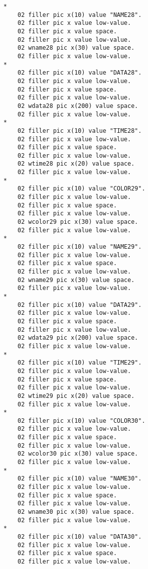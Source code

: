 {{{\begin{verbatim}
      *    
          02 filler pic x(10) value "NAME28".
          02 filler pic x value low-value.
          02 filler pic x value space.
          02 filler pic x value low-value.
          02 wname28 pic x(30) value space.
          02 filler pic x value low-value.
      *    
          02 filler pic x(10) value "DATA28".
          02 filler pic x value low-value.
          02 filler pic x value space.
          02 filler pic x value low-value.
          02 wdata28 pic x(200) value space.
          02 filler pic x value low-value.
      *    
          02 filler pic x(10) value "TIME28".
          02 filler pic x value low-value.
          02 filler pic x value space.
          02 filler pic x value low-value.
          02 wtime28 pic x(20) value space.
          02 filler pic x value low-value.
      *    
          02 filler pic x(10) value "COLOR29".
          02 filler pic x value low-value.
          02 filler pic x value space.
          02 filler pic x value low-value.
          02 wcolor29 pic x(30) value space.
          02 filler pic x value low-value.
      *    
          02 filler pic x(10) value "NAME29".
          02 filler pic x value low-value.
          02 filler pic x value space.
          02 filler pic x value low-value.
          02 wname29 pic x(30) value space.
          02 filler pic x value low-value.
      *    
          02 filler pic x(10) value "DATA29".
          02 filler pic x value low-value.
          02 filler pic x value space.
          02 filler pic x value low-value.
          02 wdata29 pic x(200) value space.
          02 filler pic x value low-value.
      *    
          02 filler pic x(10) value "TIME29".
          02 filler pic x value low-value.
          02 filler pic x value space.
          02 filler pic x value low-value.
          02 wtime29 pic x(20) value space.
          02 filler pic x value low-value.
      *    
          02 filler pic x(10) value "COLOR30".
          02 filler pic x value low-value.
          02 filler pic x value space.
          02 filler pic x value low-value.
          02 wcolor30 pic x(30) value space.
          02 filler pic x value low-value.
      *    
          02 filler pic x(10) value "NAME30".
          02 filler pic x value low-value.
          02 filler pic x value space.
          02 filler pic x value low-value.
          02 wname30 pic x(30) value space.
          02 filler pic x value low-value.
      *    
          02 filler pic x(10) value "DATA30".
          02 filler pic x value low-value.
          02 filler pic x value space.
          02 filler pic x value low-value.

\end{verbatim}}}}
